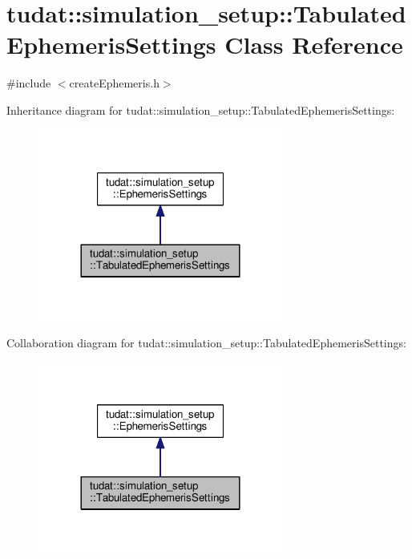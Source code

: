 \hypertarget{classtudat_1_1simulation__setup_1_1TabulatedEphemerisSettings}{}\section{tudat\+:\+:simulation\+\_\+setup\+:\+:Tabulated\+Ephemeris\+Settings Class Reference}
\label{classtudat_1_1simulation__setup_1_1TabulatedEphemerisSettings}


{\ttfamily \#include $<$create\+Ephemeris.\+h$>$}



Inheritance diagram for tudat\+:\+:simulation\+\_\+setup\+:\+:Tabulated\+Ephemeris\+Settings\+:
\nopagebreak
\begin{figure}[H]
\begin{center}
\leavevmode
\includegraphics[width=228pt]{classtudat_1_1simulation__setup_1_1TabulatedEphemerisSettings__inherit__graph}
\end{center}
\end{figure}


Collaboration diagram for tudat\+:\+:simulation\+\_\+setup\+:\+:Tabulated\+Ephemeris\+Settings\+:
\nopagebreak
\begin{figure}[H]
\begin{center}
\leavevmode
\includegraphics[width=228pt]{classtudat_1_1simulation__setup_1_1TabulatedEphemerisSettings__coll__graph}
\end{center}
\end{figure}
